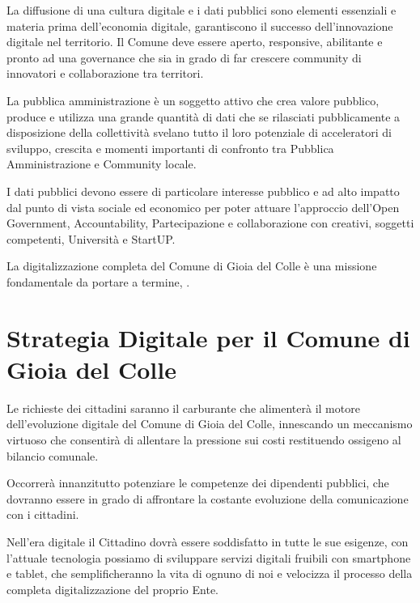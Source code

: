 \documentclass[a4paper,14pt,italian]{sphinxmanual}
\begin{document}

La diffusione di una cultura digitale e i dati pubblici sono elementi essenziali e materia prima dell’economia digitale, garantiscono il successo dell’innovazione digitale nel territorio.
Il Comune deve essere aperto, responsive, abilitante e pronto ad una governance che sia in grado di far crescere community di innovatori e collaborazione tra territori.

La pubblica amministrazione è un soggetto attivo che crea valore pubblico, produce e utilizza una grande quantità di dati che se rilasciati pubblicamente a disposizione della collettività svelano tutto il loro potenziale di acceleratori di sviluppo, crescita e momenti importanti di confronto tra Pubblica Amministrazione e Community locale.

I dati pubblici devono essere di particolare interesse pubblico e ad alto impatto dal punto di vista sociale ed economico per poter attuare l’approccio dell’Open Government, Accountability, Partecipazione e collaborazione con creativi, soggetti competenti, Università e StartUP.

La digitalizzazione completa del Comune di Gioia del Colle è una missione fondamentale da portare a termine, .


\section{Strategia Digitale per il Comune di Gioia del Colle}
\label{\detokenize{digitale:strategia-digitale-per-il-comune-di-gioia-del-colle}}
Le richieste dei cittadini saranno il carburante che alimenterà il motore dell’evoluzione digitale del Comune di Gioia del Colle, innescando un meccanismo virtuoso che consentirà di allentare la pressione sui costi restituendo ossigeno al bilancio comunale.

Occorrerà innanzitutto potenziare le competenze dei dipendenti pubblici, che dovranno essere in grado di affrontare la costante evoluzione della comunicazione con i cittadini.

Nell’era digitale il Cittadino dovrà essere soddisfatto in tutte le sue esigenze, con l’attuale tecnologia possiamo di sviluppare servizi digitali fruibili con smartphone e tablet, che semplificheranno la vita di ognuno di noi e velocizza il processo della completa digitalizzazione del proprio Ente.
\end{document}
